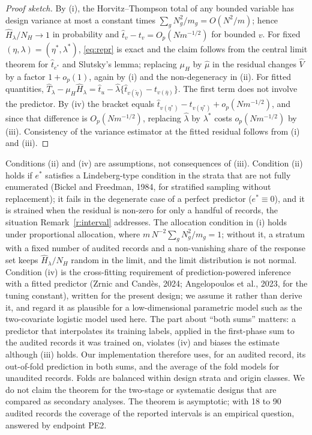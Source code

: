 \documentclass[11pt]{article}
\theoremstyle{definition}
\newcommand{\muH}{\mu_H}
\begin{document}
\begin{proof}[Proof sketch]
By (i), the Horvitz--Thompson total of any bounded variable has design variance at most a
constant times $\sum_gN_g^2/m_g=O(N^2/m)$; hence $\hat H_\lambda/N_H\to1$ in probability and
$\hat t_{v}-t_{v}=O_p(Nm^{-1/2})$ for bounded $v$. For fixed
$(\eta,\lambda)=(\eta^\ast,\lambda^\ast)$, \eqref{eq:repr} is exact and the claim follows
from the central limit theorem for $\hat t_{e^\ast}$ and Slutsky's lemma; replacing $\muH$
by $\hat\mu$ in the residual changes $\hat V$ by a factor $1+o_p(1)$, again by (i) and the
non-degeneracy in (ii). For fitted quantities,
$\hat T_\lambda-\muH\hat H_\lambda=\hat t_u-\hat\lambda\{\hat t_{v(\tilde\eta)}-t_{v(\bar\eta)}\}$.
The first term does not involve the predictor. By (iv) the bracket equals
$\hat t_{v(\eta^\ast)}-t_{v(\eta^\ast)}+o_p(Nm^{-1/2})$, and since that difference is
$O_p(Nm^{-1/2})$, replacing $\hat\lambda$ by $\lambda^\ast$ costs $o_p(Nm^{-1/2})$ by (iii).
Consistency of the variance estimator at the fitted residual follows from (i) and (iii).
\end{proof}
Conditions (ii) and (iv) are assumptions, not consequences of (iii). Condition (ii) holds
if $e^\ast$ satisfies a Lindeberg-type condition in the strata that are not fully
enumerated (Bickel and Freedman, 1984, for stratified sampling without replacement); it
fails in the degenerate case of a perfect predictor ($e^\ast\equiv0$), and it is strained
when the residual is non-zero for only a handful of records, the situation
Remark~\ref{r:interval} addresses. The allocation condition in (i) holds under
proportional allocation, where $m\,N^{-2}\sum_gN_g^2/m_g=1$; without it, a stratum with a
fixed number of audited records and a non-vanishing share of the response set keeps
$\hat H_\lambda/N_H$ random in the limit, and the limit distribution is not normal.
Condition (iv) is the cross-fitting requirement of prediction-powered inference
with a fitted predictor (Zrnic and Cand\`es, 2024; Angelopoulos et al., 2023, for the
tuning constant), written for the present design; we assume it rather than derive it, and
regard it as plausible for a low-dimensional parametric model such as the two-covariate
logistic model used here. The part about ``both sums'' matters: a predictor that
interpolates its training labels, applied in the first-phase sum to the audited records it
was trained on, violates (iv) and biases the estimate although (iii) holds. Our
implementation therefore uses, for an audited record, its out-of-fold prediction in both
sums, and the average of the fold models for unaudited records. Folds are balanced within
design strata and origin classes. We do not claim the theorem for the two-stage or
systematic designs that are compared as secondary analyses. The theorem is asymptotic;
with 18 to 90 audited records the coverage of the reported intervals is an empirical
question, answered by endpoint PE2.
\end{document}
